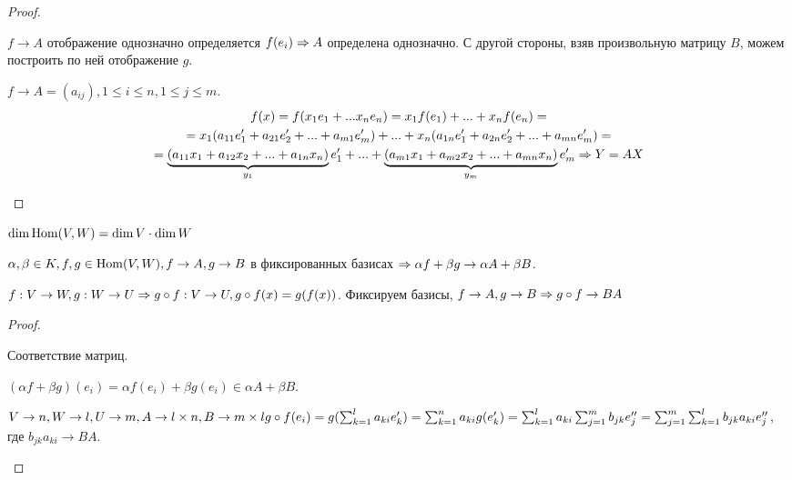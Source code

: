 \begin{proof}
	\begin{MyList}
		\item $f \to A$ отображение однозначно определяется $f(e_i) \Rightarrow A$ определена однозначно.
		С другой стороны, взяв произвольную матрицу $B$, можем построить по ней отображение $g$.

		\item $f \to A = (a_{ij}), 1 \leqslant i \leqslant n, 1 \leqslant j \leqslant m$.
		\begin{gather*}
			f(x) = f(x_1 e_1 + ... x_n e_n) = x_1 f(e_1) + ... + x_n f(e_n) = \\
			= x_1 (a_{11} e_1' + a_{21} e_2' + ... + a_{m1} e_m') + ... + x_n (a_{1n} e_1' + a_{2n} e_2' + ... + a_{mn} e_m') = \\
			= \underbrace{(a_{11} x_1 + a_{12} x_2 + ... + a_{1n} x_n)}_{y_1} e_1' + ... + \underbrace{(a_{m1} x_1 + a_{m2} x_2 + ... + a_{mn} x_n)}_{y_m} e_m' \Rightarrow Y = AX
		\end{gather*}
	\end{MyList}
\end{proof}

\begin{Cons}
	\begin{MyList}
		\item $\dim \operatorname{Hom}(V, W) = \dim V \cdot \dim W$
		\item $\alpha, \beta \in K, f, g \in \operatorname{Hom}(V, W), f \to A, g \to B$ в фиксированных базисах $\Rightarrow \alpha f + \beta g \to \alpha A + \beta B$.
		\item $f : V \to W, g : W \to U \Rightarrow g \circ f : V \to U, g \circ f(x) = g(f(x))$.
		Фиксируем базисы, $f \to A, g \to B \Rightarrow g \circ f \to BA$  
	\end{MyList}
\end{Cons}

\gdef\AuthorName{Дарья Гольденберг}

\begin{proof}
	\begin{MyList}
		\item Соответствие матриц.
		\item $(\alpha f  + \beta g) (e_i) = \alpha f (e_i) + \beta g (e_i) \in \alpha A + \beta B$.
		\item $ V \to n, W \to l, U \to m, A \to l \times n, B \to m\times l\\ g \circ f (e_i) = g (\sum_{k=1}^l a_{ki}e_k') = \sum_{k=1}^n a_{ki} g(e_k') = \sum_{k=1}^l a_{ki} \sum_{j =1}^m b_{jk} e_j'' = \sum_{j = 1}^m \sum_{k = 1}^l b_{jk} a_{ki} e_j''$, где $b_{jk} a_{ki} \to BA$.
	\end{MyList}
\end{proof}

